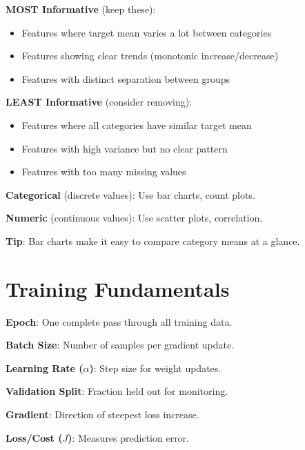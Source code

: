 \documentclass[11pt,a4paper]{article}
\begin{document}
\begin{warningbox}

\textbf{MOST Informative} (keep these):
\begin{itemize}[leftmargin=*,nosep]
\item Features where target mean varies a lot between categories
\item Features showing clear trends (monotonic increase/decrease)
\item Features with distinct separation between groups
\end{itemize}

\textbf{LEAST Informative} (consider removing):
\begin{itemize}[leftmargin=*,nosep]
\item Features where all categories have similar target mean
\item Features with high variance but no clear pattern
\item Features with too many missing values
\end{itemize}

\end{warningbox}

\begin{notebox}

\textbf{Categorical} (discrete values): Use bar charts, count plots.

\textbf{Numeric} (continuous values): Use scatter plots, correlation.

\textbf{Tip}: Bar charts make it easy to compare category means at a glance.
\end{notebox}

\section{Training Fundamentals}

\begin{definitionbox}

\textbf{Epoch}: One complete pass through all training data.

\textbf{Batch Size}: Number of samples per gradient update.

\textbf{Learning Rate ($\alpha$)}: Step size for weight updates.

\textbf{Validation Split}: Fraction held out for monitoring.

\textbf{Gradient}: Direction of steepest loss increase.

\textbf{Loss/Cost ($J$)}: Measures prediction error.
\end{definitionbox}
\end{document}
